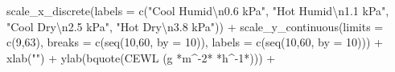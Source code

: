 \documentclass[
]{article}
\newenvironment{Shaded}{\begin{snugshade}}{\end{snugshade}}
\newcommand{\AttributeTok}[1]{\textcolor[rgb]{0.77,0.63,0.00}{#1}}
\newcommand{\DecValTok}[1]{\textcolor[rgb]{0.00,0.00,0.81}{#1}}
\newcommand{\FunctionTok}[1]{\textcolor[rgb]{0.00,0.00,0.00}{#1}}
\newcommand{\NormalTok}[1]{#1}
\newcommand{\SpecialCharTok}[1]{\textcolor[rgb]{0.00,0.00,0.00}{#1}}
\newcommand{\StringTok}[1]{\textcolor[rgb]{0.31,0.60,0.02}{#1}}
\begin{document}
\begin{Shaded}
\begin{Highlighting}[]
  \FunctionTok{scale\_x\_discrete}\NormalTok{(}\AttributeTok{labels =} \FunctionTok{c}\NormalTok{(}\StringTok{"Cool Humid}\SpecialCharTok{\textbackslash{}n}\StringTok{0.6 kPa"}\NormalTok{,}
                               \StringTok{"Hot Humid}\SpecialCharTok{\textbackslash{}n}\StringTok{1.1 kPa"}\NormalTok{,}
                               \StringTok{"Cool Dry}\SpecialCharTok{\textbackslash{}n}\StringTok{2.5 kPa"}\NormalTok{,}
                               \StringTok{"Hot Dry}\SpecialCharTok{\textbackslash{}n}\StringTok{3.8 kPa"}\NormalTok{)) }\SpecialCharTok{+} 
  \FunctionTok{scale\_y\_continuous}\NormalTok{(}\AttributeTok{limits =} \FunctionTok{c}\NormalTok{(}\DecValTok{9}\NormalTok{,}\DecValTok{63}\NormalTok{),}
                     \AttributeTok{breaks =} \FunctionTok{c}\NormalTok{(}\FunctionTok{seq}\NormalTok{(}\DecValTok{10}\NormalTok{,}\DecValTok{60}\NormalTok{, }\AttributeTok{by =} \DecValTok{10}\NormalTok{)),}
                     \AttributeTok{labels =} \FunctionTok{c}\NormalTok{(}\FunctionTok{seq}\NormalTok{(}\DecValTok{10}\NormalTok{,}\DecValTok{60}\NormalTok{, }\AttributeTok{by =} \DecValTok{10}\NormalTok{))) }\SpecialCharTok{+}
  \FunctionTok{xlab}\NormalTok{(}\StringTok{""}\NormalTok{) }\SpecialCharTok{+} 
  \FunctionTok{ylab}\NormalTok{(}\FunctionTok{bquote}\NormalTok{(}\StringTok{\textquotesingle{}CEWL (g \textquotesingle{}}\SpecialCharTok{*}\NormalTok{m}\SpecialCharTok{\^{}{-}}\DecValTok{2}\SpecialCharTok{*}\StringTok{\textquotesingle{} \textquotesingle{}}\SpecialCharTok{*}\NormalTok{h}\SpecialCharTok{\^{}{-}}\DecValTok{1}\SpecialCharTok{*}\StringTok{\textquotesingle{})\textquotesingle{}}\NormalTok{)) }\SpecialCharTok{+} 
  

\end{Highlighting}
\end{Shaded}
\end{document}
